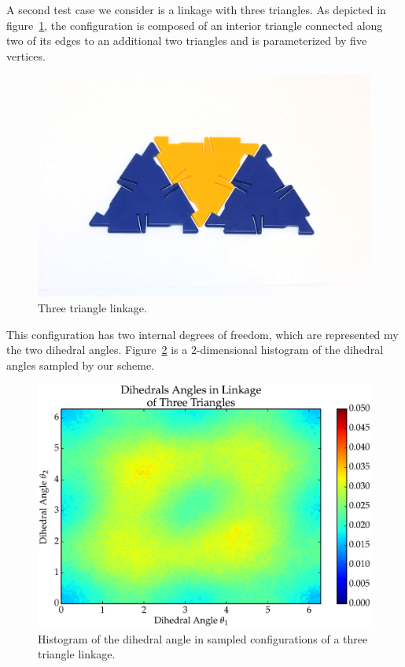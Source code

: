 A second test case we consider is a linkage with three triangles. As depicted in figure~\ref{fig:T3_diagram}, the configuration is composed of an interior triangle connected along two of its edges to an additional two triangles and is parameterized by five vertices. 
\begin{figure}[ht]
\centering
  \includegraphics[scale=0.1]{images/T3_diagram.eps}
\caption{Three triangle linkage.}
\label{fig:T3_diagram}
\end{figure}
This configuration has two internal degrees of freedom, which are represented my the two dihedral angles. Figure~\ref{fig:T3_1} is a $2$-dimensional histogram of the dihedral angles sampled by our scheme. 
\begin{figure}[ht]
\centering
  \includegraphics[scale=0.6]{images/T3_1_2D.eps}
\caption{Histogram of the dihedral angle in sampled configurations of a three triangle linkage.}
\label{fig:T3_1}
\end{figure}

